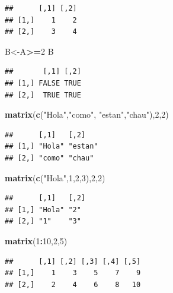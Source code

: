 \documentclass[
]{book}
\newenvironment{Shaded}{\begin{snugshade}}{\end{snugshade}}
\newcommand{\DecValTok}[1]{\textcolor[rgb]{0.00,0.00,0.81}{#1}}
\newcommand{\KeywordTok}[1]{\textcolor[rgb]{0.13,0.29,0.53}{\textbf{#1}}}
\newcommand{\NormalTok}[1]{#1}
\newcommand{\OperatorTok}[1]{\textcolor[rgb]{0.81,0.36,0.00}{\textbf{#1}}}
\newcommand{\StringTok}[1]{\textcolor[rgb]{0.31,0.60,0.02}{#1}}
\begin{document}
\begin{verbatim}
##      [,1] [,2]
## [1,]    1    2
## [2,]    3    4
\end{verbatim}

\begin{Shaded}
\begin{Highlighting}[]
\NormalTok{B<-A}\OperatorTok{>=}\DecValTok{2}
\NormalTok{B}
\end{Highlighting}
\end{Shaded}

\begin{verbatim}
##       [,1] [,2]
## [1,] FALSE TRUE
## [2,]  TRUE TRUE
\end{verbatim}

\begin{Shaded}
\begin{Highlighting}[]
\KeywordTok{matrix}\NormalTok{(}\KeywordTok{c}\NormalTok{(}\StringTok{"Hola"}\NormalTok{,}\StringTok{"como"}\NormalTok{, }\StringTok{"estan"}\NormalTok{,}\StringTok{"chau"}\NormalTok{),}\DecValTok{2}\NormalTok{,}\DecValTok{2}\NormalTok{)}
\end{Highlighting}
\end{Shaded}

\begin{verbatim}
##      [,1]   [,2]   
## [1,] "Hola" "estan"
## [2,] "como" "chau"
\end{verbatim}

\begin{Shaded}
\begin{Highlighting}[]
\KeywordTok{matrix}\NormalTok{(}\KeywordTok{c}\NormalTok{(}\StringTok{"Hola"}\NormalTok{,}\DecValTok{1}\NormalTok{,}\DecValTok{2}\NormalTok{,}\DecValTok{3}\NormalTok{),}\DecValTok{2}\NormalTok{,}\DecValTok{2}\NormalTok{)}
\end{Highlighting}
\end{Shaded}

\begin{verbatim}
##      [,1]   [,2]
## [1,] "Hola" "2" 
## [2,] "1"    "3"
\end{verbatim}

\begin{Shaded}
\begin{Highlighting}[]
\KeywordTok{matrix}\NormalTok{(}\DecValTok{1}\OperatorTok{:}\DecValTok{10}\NormalTok{,}\DecValTok{2}\NormalTok{,}\DecValTok{5}\NormalTok{)}
\end{Highlighting}
\end{Shaded}

\begin{verbatim}
##      [,1] [,2] [,3] [,4] [,5]
## [1,]    1    3    5    7    9
## [2,]    2    4    6    8   10
\end{verbatim}
\end{document}
